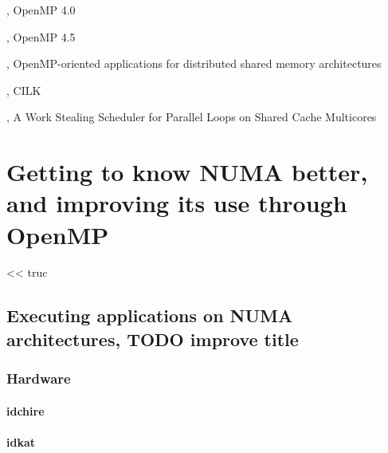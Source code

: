 




\cite{openmp40}, OpenMP 4.0

\cite{openmp45}, OpenMP 4.5

\cite{Marowka2004}, OpenMP-oriented applications for distributed shared memory architectures

\cite{cilk5}, CILK

\cite{Tchiboukdjian2010}, A Work Stealing Scheduler for Parallel Loops on Shared Cache Multicores





\part{Getting to know NUMA better, and improving its use through OpenMP}

\begin{savequote}[6cm]
<< truc
\end{savequote}

\chapter{Executing applications on NUMA architectures, TODO improve title}\label{chap:contrib:characterization}
\chaptertoc

\section{Hardware}

\subsection{idchire}
\subsection{idkat}
